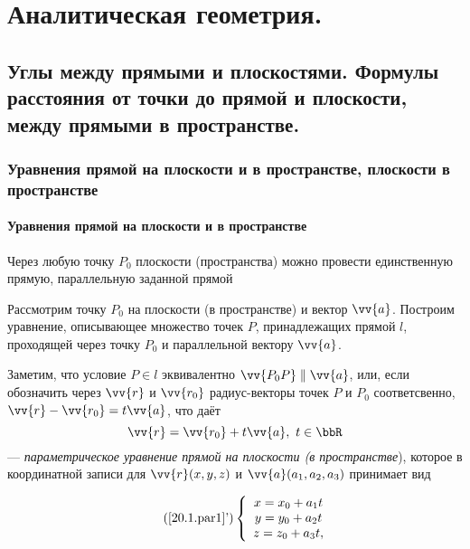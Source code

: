 \part[Аналитическая геометрия.]{Аналитическая геометрия.}%

\chapter{Углы между прямыми и плоскостями. Формулы расстояния от точки до прямой и плоскости, между прямыми в пространстве.}
\section{Уравнения прямой на плоскости и в пространстве, плоскости в пространстве}
\subsection{Уравнения прямой на плоскости и в пространстве}
\begin{axiome} 
  Через любую точку $P_0$ плоскости (пространства) можно провести единственную прямую, параллельную заданной прямой
\end{axiome}
  Рассмотрим точку $P_0$ на плоскости (в пространстве) и вектор $\vv{a}$. Построим уравнение, описывающее множество точек $P$, принадлежащих прямой $l$, проходящей через точку $P_0$ и параллельной вектору $\vv{a}$.

  Заметим, что условие $P \in l$ эквивалентно $ \vv{P_0P} \parallel \vv{a} $, или, если обозначить через $\vv{r}$ и $\vv{r_0}$ радиус-векторы точек $P$ и $P_0$ соответсвенно, $\vv{r}-\vv{r_0} = t\vv{a}$, что даёт
\begin{equation}\label{20.1.par1}
\vv{r}=\vv{r_0}+t\vv{a},\ t \in \bbR
\end{equation}
--- \textit{параметрическое уравнение прямой на плоскости \textup{(}в пространстве}), которое в координатной записи для $\vv{r}(x,y,z)$ и $\vv{a}(a_1,a_2,a_3)$ принимает вид

\begin{equation}\label{20.1.par2}\tag{\ref{20.1.par1}'}
  \left\lbrace\begin{array}{crl}
  x=x_0+a_1t\\
  y=y_0+a_2t\\
  z=z_0+a_3t,\\ 
  \end{array}\right.
\end{equation}

